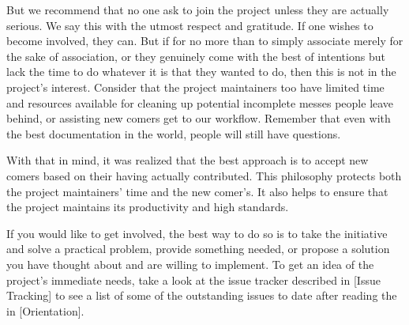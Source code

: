 But we recommend that no one ask to join the project unless they are actually serious. We say this with the utmost respect and gratitude. If one wishes to become involved, they can. But if for no more than to simply associate merely for the sake of association, or they genuinely come with the best of intentions but lack the time to do whatever it is that they wanted to do, then this is not in the project's interest. Consider that the project maintainers too have limited time and resources available for cleaning up potential incomplete messes people leave behind, or assisting new comers get  to our workflow. Remember that even with the best documentation in the world, people will still have questions.

With that in mind, it was realized that the best approach is to accept new comers based on their having actually contributed. This philosophy protects both the project maintainers' time and the new comer's. It also helps to ensure that the project maintains its productivity and high standards. 

If you would like to get involved, the best way to do so is to take the initiative and solve a practical problem, provide something needed, or propose a solution you have thought about and are willing to implement. To get an idea of the project's immediate needs, take a look at the issue tracker described in [Issue Tracking] to see a list of some of the outstanding issues to date after reading the \about[Orientation] in [Orientation].

